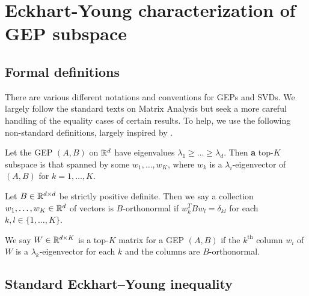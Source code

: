 \graphicspath{{chapters/gradient_descent/}}
\section{Eckhart-Young characterization of GEP subspace}\label{app:proofs}
\subsection{Formal definitions}
There are various different notations and conventions for GEPs and SVDs.
We largely follow the standard texts on Matrix Analysis \citep{stewart_matrix_1990,bhatiamatrix1997} but seek a more careful handling of the equality cases of certain results.
To help, we use the following non-standard definitions, largely inspired by \citet{carlssonvon2021}.

\begin{definition}
    Let the GEP $(A,B)$ on $\mathbb{R}^d$ have eigenvalues $\lambda_1 \geq \dots \geq \lambda_d$. Then \textbf{a} top-$K$ subspace is that spanned by some $w_1,\dots,w_K$, where $w_k$ is a $\lambda_i$-eigenvector of $(A,B)$ for $k=1,\dots,K$.
\end{definition}

\begin{definition}[$B$-orthonormality]
    Let $B \in \mathbb{R}^{d \times d}$ be strictly positive definite. Then we say a collection $w_1,\dots,w_K \in \mathbb{R}^{d}$ of vectors is $B$-orthonormal if $w_k^T B w_l = \delta_{kl}$ for each $k,l \in \{1,\dots,K\}$.
\end{definition}

\begin{definition}
    We say $W \in \mathbb{R}^{d \times K}$ is a top-$K$ matrix for a GEP $(A,B)$ if the $k^{\text{th}}$ column $w_i$ of $W$ is a $\lambda_k$-eigenvector for each $k$ and the columns are $B$-orthonormal.
\end{definition}


\subsection{Standard Eckhart--Young inequality}


